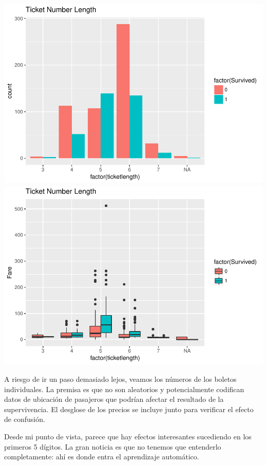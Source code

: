 \documentclass[]{article}
\begin{document}
\includegraphics{titanicDataClean_files/figure-latex/plot23-1.pdf}
\includegraphics{titanicDataClean_files/figure-latex/plot23-2.pdf}

A riesgo de ir un paso demasiado lejos, veamos los números de los
boletos individuales. La premisa es que no son aleatorios y
potencialmente codifican datos de ubicación de pasajeros que podrían
afectar el resultado de la supervivencia. El desglose de los precios se
incluye junto para verificar el efecto de confusión.

Desde mi punto de vista, parece que hay efectos interesantes sucediendo
en los primeros 5 dígitos. La gran noticia es que no tenemos que
entenderlo completamente: ahí es donde entra el aprendizaje automático.
\end{document}
